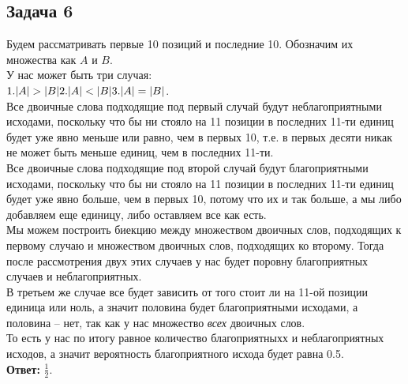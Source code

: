 	\subsection{Задача 6}
	Будем рассматривать первые 10 позиций и последние 10. Обозначим их множества как $A$ и $B$.\\
	У нас может быть три случая:\\
	$1.|A| > |B| \\
	2.|A| < |B| \\
	3.|A| = |B|$.\\
	
	Все двоичные слова подходящие под первый случай будут неблагоприятными исходами, поскольку что бы ни стояло на 11 позиции в последних 11-ти единиц будет уже явно меньше или равно, чем в первых 10, т.е. в первых десяти никак не может быть меньше единиц, чем в последних 11-ти. \\
	Все двоичные слова подходящие под второй случай будут благоприятными исходами, поскольку что бы ни стояло на 11 позиции в последних 11-ти единиц будет уже явно больше, чем в первых 10, потому что их и так больше, а мы либо добавляем еще единицу, либо оставляем все как есть. \\
	Мы можем построить биекцию между множеством двоичных слов, подходящих к первому случаю и множеством двоичных слов, подходящих ко второму. Тогда после рассмотрения двух этих случаев у нас будет поровну благоприятных случаев и неблагоприятных. \\
	В третьем же случае все будет зависить от того стоит ли на 11-ой позиции единица или ноль, а значит половина будет благоприятными исходами, а половина -- нет, так как у нас множество \textit{всех} двоичных слов. \\
	То есть у нас по итогу равное количество благоприятныхх и неблагоприятных исходов, а значит вероятность благоприятного исхода будет равна 0.5. \\
	\textbf{Ответ:} $\frac{1}{2}$.
	
